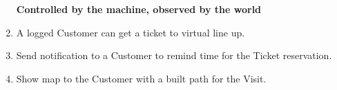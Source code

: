 \documentclass[a4paper, 12pt, oneside]{article}
\newcommand*{\lorenzo}[1]{\textcolor{BurntOrange}{#1}}
\newcommand{\yasmin}[1]{\textcolor{Red}{#1}}
\newcommand{\giovanni}[1]{\textcolor{Blue}{#1}}
\begin{document}
\begin{itemize}
\begin{enumerate}[label={S.S.\arabic{*}}, align=left]
        \item[\textbf{Controlled by the machine, observed by the world}]
        \item \label{shared:liningUp} A logged Customer can get a ticket to virtual line up.
        
        
        
        
        
        
        \item \label{shared:sendNotification} Send notification to a Customer to remind time for the Ticket reservation.
        \item \label{shared:showMap} Show map to the Customer with a built path for the Visit.
        

\end{enumerate}
\end{itemize}
\end{document}
